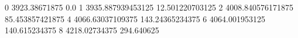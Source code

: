 0 3923.38671875 0.0
1 3935.887939453125 12.501220703125
2 4008.840576171875 85.453857421875
4 4066.63037109375 143.24365234375
6 4064.001953125 140.615234375
8 4218.02734375 294.640625
